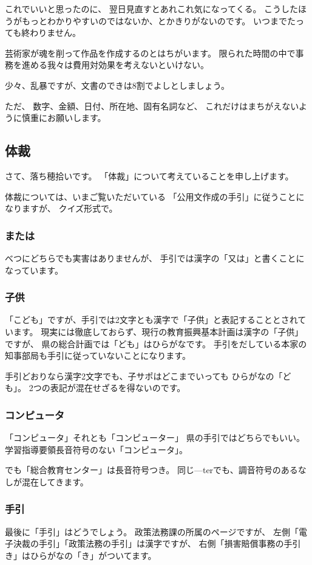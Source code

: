 \documentclass[uplatex,jis2004,dvipdfmx,12pt]{jsarticle}
\begin{document}
これでいいと思ったのに、
翌日見直すとあれこれ気になってくる。
こうしたほうがもっとわかりやすいのではないか、とかきりがないのです。
いつまでたっても終わりません。

芸術家が魂を削って作品を作成するのとはちがいます。
限られた時間の中で事務を進める我々は費用対効果を考えないといけない。

少々、乱暴ですが、文書のできは8割でよしとしましょう。


ただ、
数字、金額、日付、所在地、固有名詞など、
これだけはまちがえないように慎重にお願いします。




\subsection{体裁}
さて、落ち穂拾いです。
「体裁」について考えていることを申し上げます。


体裁については、いまご覧いただいている
「公用文作成の手引」に従うことになりますが、
クイズ形式で。

\subsubsection{または}
べつにどちらでも実害はありませんが、
手引では漢字の「又は」と書くことになっています。


\subsubsection{子供}
「こども」ですが、手引では2文字とも漢字で「子供」と表記することとされています。
現実には徹底しておらず、現行の教育振興基本計画は漢字の「子供」ですが、
県の総合計画では「ども」はひらがなです。
手引をだしている本家の知事部局も手引に従っていないことになります。

手引どおりなら漢字2文字でも、子サポはどこまでいっても
ひらがなの「ども」。
2つの表記が混在せざるを得ないのです。

\subsubsection{コンピュータ}
「コンピュータ」それとも「コンピューター」
県の手引ではどちらでもいい。
学習指導要領長音符号のない「コンピュータ」。

でも「総合教育センター」は長音符号つき。
同じ---terでも、調音符号のあるなしが混在してきます。

\subsubsection{手引}
最後に「手引」はどうでしょう。
政策法務課の所属のページですが、
左側「電子決裁の手引」「政策法務の手引」は漢字ですが、
右側「損害賠償事務の手引き」はひらがなの「き」がついてます。
\end{document}
